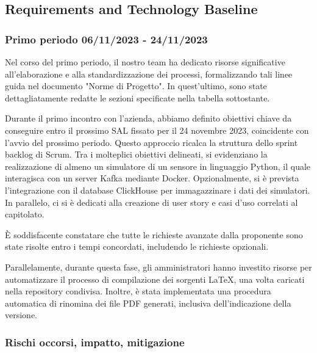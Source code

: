 \subsection{Requirements and Technology Baseline}
\subsubsection{Primo periodo  06/11/2023 - 24/11/2023}
    Nel corso del primo periodo, il nostro team ha dedicato risorse significative all'elaborazione e alla standardizzazione dei processi, formalizzando tali linee guida nel documento "Norme di Progetto". In quest'ultimo, sono state dettagliatamente redatte le sezioni specificate nella tabella sottostante.

    Durante il primo incontro con l'azienda, abbiamo definito obiettivi chiave da conseguire entro il prossimo SAL fissato per il 24 novembre 2023, coincidente con l'avvio del prossimo periodo. Questo approccio ricalca la struttura dello sprint backlog di Scrum.
    Tra i molteplici obiettivi delineati, si evidenziano la realizzazione di almeno un simulatore di un sensore in linguaggio Python, il quale interagisca con un server Kafka mediante Docker. Opzionalmente, si è prevista l'integrazione con il database ClickHouse per immagazzinare i dati dei simulatori. In parallelo, ci si è dedicati alla creazione di user story e casi d'uso correlati al capitolato.

    È soddisfacente constatare che tutte le richieste avanzate dalla proponente sono state risolte entro i tempi concordati, includendo le richieste opzionali.

    Parallelamente, durante questa fase, gli amministratori hanno investito risorse per automatizzare il processo di compilazione dei sorgenti \LaTeX , una volta caricati nella repository condivisa. Inoltre, è stata implementata una procedura automatica di rinomina dei file PDF generati, inclusiva dell'indicazione della versione.

\subsubsection*{Rischi occorsi, impatto, mitigazione} 

